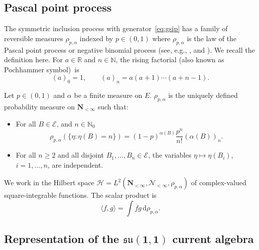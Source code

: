 \documentclass[pdftex]{sigma}
\numberwithin{equation}{section}
\newcommand{\N}{\mathbb{N}}
\newcommand{\R}{\mathbb{R}}
\newcommand{\dd}{\mathrm{d}} %
\newcommand{\1}{\mathbbm{1}}
\begin{document}
\subsection{Pascal point process} \label{sec:pascaldef}
The symmetric inclusion process with generator~\eqref{eq:gsip} has a family of reversible measures $\rho_{p,\alpha}$ indexed by $p\in (0,1)$ \cite[Theorem 5.2]{IntertwiningConsistent} where $\rho_{p,\alpha}$ is the law of the Pascal point process or negative binomial process (see, e.g., \cite[Section~2.7]{serfozo1990point}, \cite{kozubowski2008distributional} and \cite[Section~5.2]{IntertwiningConsistent}). We recall the definition here.
For $a\in \R$ and $n\in \N$, the rising factorial (also known as Pochhammer symbol)~is
\[
	(a)_0 = 1,\qquad (a)_n = a(a+1)\cdots (a+n-1).
\]

\begin{Definition}
 Let $p\in (0,1)$ and $\alpha$ be a finite measure on $E$. $\rho_{p,\alpha}$ is the uniquely defined probability measure on $\mathbf N_{<\infty}$ such that:
 \begin{itemize}\itemsep=0pt
 	\item For all $B\in \mathcal E$, and $n\in \N_0$
 	\begin{equation} \label{eq:negbin}
 		\rho_{p,\alpha}(\{\eta\colon \eta(B) =n\}) = (1-p)^{\alpha(B)} \frac{p^n}{n!} (\alpha(B))_{n}.
 	\end{equation}
 	\item For all $n \geq 2$ and all disjoint $B_1,\ldots, B_n\in \mathcal E$, the variables $\eta\mapsto \eta(B_i)$, $i=1,\ldots, n$, are independent.
 \end{itemize}
\end{Definition}

We work in the Hilbert space $\mathcal H = L^2(\mathbf N_{<\infty}, \mathcal N_{<\infty}, \rho_{p,\alpha})$ of complex-valued square-integrable functions. The scalar product is
\[
	\langle f,g \rangle = \int \overline{f} g\, \dd\rho_{p,\alpha}.
\]

\subsection[Representation of the su(1,1)]{Representation of the $\boldsymbol{\mathfrak{su}(1,1)}$ current algebra} \label{sec:su11}
\end{document}
